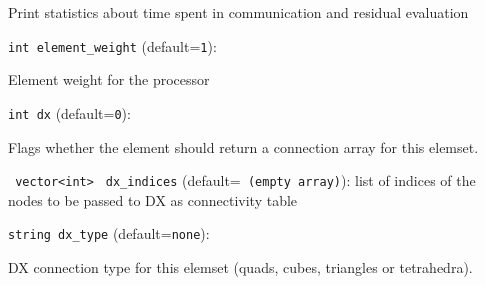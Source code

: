 Print statistics about time spent in communication and residual evaluation

\item\verb+int element_weight+ {\rm(default=\verb|1|)}:

Element weight for the processor

\item\verb+int dx+ {\rm(default=\verb|0|)}:

Flags whether the element should return a connection array for this elemset. 

\item\verb+ vector<int>+ \verb+ dx_indices+ {\rm(default=\verb| (empty array)|)}:
 list of indices of the nodes to be passed to DX
as connectivity table %
\item\verb+string dx_type+ {\rm(default=\verb|none|)}:

DX connection type for this elemset (quads, cubes,
 triangles or tetrahedra). 

